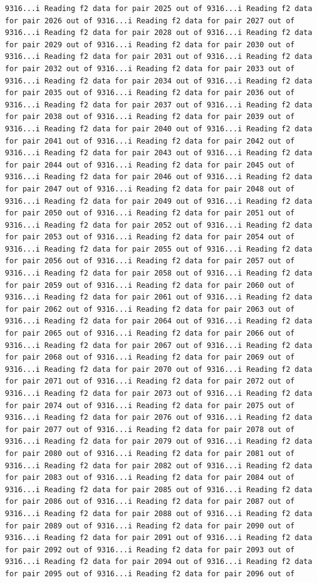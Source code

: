 \documentclass[
]{article}
\begin{document}
\begin{verbatim}
9316...i Reading f2 data for pair 2025 out of 9316...i Reading f2 data for pair 2026 out of 9316...i Reading f2 data for pair 2027 out of 9316...i Reading f2 data for pair 2028 out of 9316...i Reading f2 data for pair 2029 out of 9316...i Reading f2 data for pair 2030 out of 9316...i Reading f2 data for pair 2031 out of 9316...i Reading f2 data for pair 2032 out of 9316...i Reading f2 data for pair 2033 out of 9316...i Reading f2 data for pair 2034 out of 9316...i Reading f2 data for pair 2035 out of 9316...i Reading f2 data for pair 2036 out of 9316...i Reading f2 data for pair 2037 out of 9316...i Reading f2 data for pair 2038 out of 9316...i Reading f2 data for pair 2039 out of 9316...i Reading f2 data for pair 2040 out of 9316...i Reading f2 data for pair 2041 out of 9316...i Reading f2 data for pair 2042 out of 9316...i Reading f2 data for pair 2043 out of 9316...i Reading f2 data for pair 2044 out of 9316...i Reading f2 data for pair 2045 out of 9316...i Reading f2 data for pair 2046 out of 9316...i Reading f2 data for pair 2047 out of 9316...i Reading f2 data for pair 2048 out of 9316...i Reading f2 data for pair 2049 out of 9316...i Reading f2 data for pair 2050 out of 9316...i Reading f2 data for pair 2051 out of 9316...i Reading f2 data for pair 2052 out of 9316...i Reading f2 data for pair 2053 out of 9316...i Reading f2 data for pair 2054 out of 9316...i Reading f2 data for pair 2055 out of 9316...i Reading f2 data for pair 2056 out of 9316...i Reading f2 data for pair 2057 out of 9316...i Reading f2 data for pair 2058 out of 9316...i Reading f2 data for pair 2059 out of 9316...i Reading f2 data for pair 2060 out of 9316...i Reading f2 data for pair 2061 out of 9316...i Reading f2 data for pair 2062 out of 9316...i Reading f2 data for pair 2063 out of 9316...i Reading f2 data for pair 2064 out of 9316...i Reading f2 data for pair 2065 out of 9316...i Reading f2 data for pair 2066 out of 9316...i Reading f2 data for pair 2067 out of 9316...i Reading f2 data for pair 2068 out of 9316...i Reading f2 data for pair 2069 out of 9316...i Reading f2 data for pair 2070 out of 9316...i Reading f2 data for pair 2071 out of 9316...i Reading f2 data for pair 2072 out of 9316...i Reading f2 data for pair 2073 out of 9316...i Reading f2 data for pair 2074 out of 9316...i Reading f2 data for pair 2075 out of 9316...i Reading f2 data for pair 2076 out of 9316...i Reading f2 data for pair 2077 out of 9316...i Reading f2 data for pair 2078 out of 9316...i Reading f2 data for pair 2079 out of 9316...i Reading f2 data for pair 2080 out of 9316...i Reading f2 data for pair 2081 out of 9316...i Reading f2 data for pair 2082 out of 9316...i Reading f2 data for pair 2083 out of 9316...i Reading f2 data for pair 2084 out of 9316...i Reading f2 data for pair 2085 out of 9316...i Reading f2 data for pair 2086 out of 9316...i Reading f2 data for pair 2087 out of 9316...i Reading f2 data for pair 2088 out of 9316...i Reading f2 data for pair 2089 out of 9316...i Reading f2 data for pair 2090 out of 9316...i Reading f2 data for pair 2091 out of 9316...i Reading f2 data for pair 2092 out of 9316...i Reading f2 data for pair 2093 out of 9316...i Reading f2 data for pair 2094 out of 9316...i Reading f2 data for pair 2095 out of 9316...i Reading f2 data for pair 2096 out of 
\end{verbatim}
\end{document}
